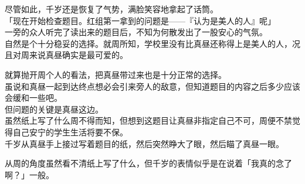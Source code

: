 尽管如此，千岁还是恢复了气势，满脸笑容地拿起了话筒。\\

「现在开始检查题目。红组第一拿到的问题是——『认为是美人的人』呢」\\

一旁的众人听完了读出来的题目后，不知为何散发出了一股安心的气氛。\\

自然是个十分稳妥的选择。就周所知，学校里没有比真昼还称得上是美人的人，况且对周来说真昼确实是最可爱的。

就算抛开周个人的看法，把真昼带过来也是十分正常的选择。\\

虽说和真昼一起到达终点想必会引来旁人的敌意，但知道题目的内容之后多少应该会缓和一些吧。\\

但问题的关键是真昼这边。\\

虽然纸上写了什么周不得而知，但想到这题目让真昼非指定自己不可，周便不禁觉得自己安宁的学生生活将要不保。\\

千岁从真昼手上接过写着题目的纸，然后突然睁大了眼，然后瞄了真昼一眼。

从周的角度虽然看不清纸上写了什么，但千岁的表情似乎是在说着「我真的念了啊？」一般。\\

